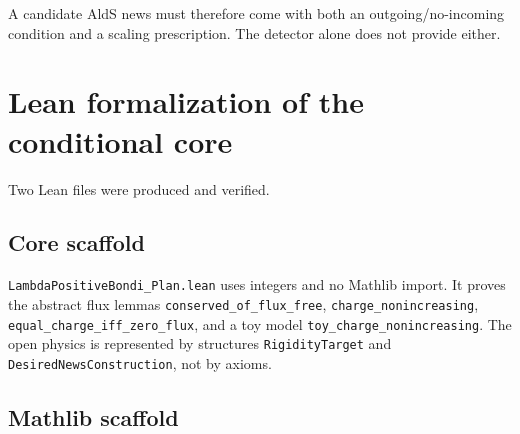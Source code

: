 \documentclass[11pt,a4paper]{article}
\begin{document}
A candidate AldS news must therefore come with both an outgoing/no-incoming condition and a scaling prescription.  The detector alone does not provide either.

\section{Lean formalization of the conditional core}

Two Lean files were produced and verified.

\subsection{Core scaffold}

\texttt{LambdaPositiveBondi\_Plan.lean} uses integers and no Mathlib import.  It proves the abstract flux lemmas
\texttt{conserved\_of\_flux\_free}, \texttt{charge\_nonincreasing}, \texttt{equal\_charge\_iff\_zero\_flux}, and a toy model \texttt{toy\_charge\_nonincreasing}.  The open physics is represented by structures \texttt{RigidityTarget} and \texttt{DesiredNewsConstruction}, not by axioms.

\subsection{Mathlib scaffold}
\end{document}
